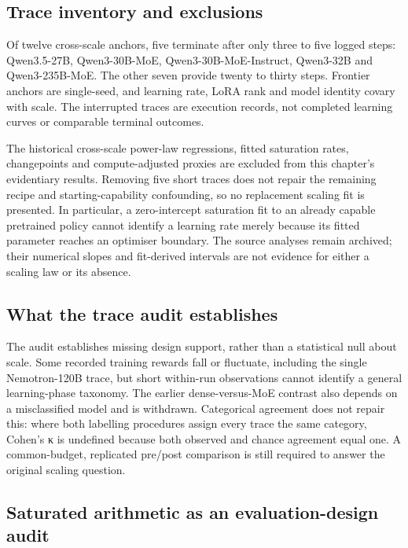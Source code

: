 \documentclass[12pt,a4paper]{report}
\begin{document}
\subsection{Trace inventory and
exclusions}\label{trace-inventory-and-exclusions}

Of twelve cross-scale anchors, five terminate after only three to five
logged steps: Qwen3.5-27B, Qwen3-30B-MoE, Qwen3-30B-MoE-Instruct,
Qwen3-32B and Qwen3-235B-MoE. The other seven provide twenty to thirty
steps. Frontier anchors are single-seed, and learning rate, LoRA rank
and model identity covary with scale. The interrupted traces are
execution records, not completed learning curves or comparable terminal
outcomes.

The historical cross-scale power-law regressions, fitted saturation
rates, changepoints and compute-adjusted proxies are excluded from this
chapter's evidentiary results. Removing five short traces does not
repair the remaining recipe and starting-capability confounding, so no
replacement scaling fit is presented. In particular, a zero-intercept
saturation fit to an already capable pretrained policy cannot identify a
learning rate merely because its fitted parameter reaches an optimiser
boundary. The source analyses remain archived; their numerical slopes
and fit-derived intervals are not evidence for either a scaling law or
its absence.

\subsection{What the trace audit
establishes}\label{what-the-trace-audit-establishes}

The audit establishes missing design support, rather than a statistical
null about scale. Some recorded training rewards fall or fluctuate,
including the single Nemotron-120B trace, but short within-run
observations cannot identify a general learning-phase taxonomy. The
earlier dense-versus-MoE contrast also depends on a misclassified model
and is withdrawn. Categorical agreement does not repair this: where both
labelling procedures assign every trace the same category, Cohen's κ is
undefined because both observed and chance agreement equal one. A
common-budget, replicated pre/post comparison is still required to
answer the original scaling question.

\subsection{Saturated arithmetic as an evaluation-design
audit}\label{saturated-arithmetic-as-an-evaluation-design-audit}
\end{document}
